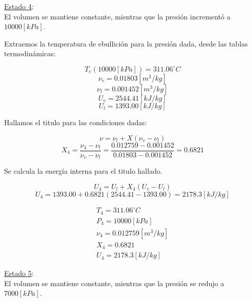 \documentclass[letter,11pt]{article}
\begin{document}
\begin{enumerate}
\underline{Estado 4}:\\
El volumen se mantiene constante, mientras que la presión incrementó a
$10000[kPa]$.

Extraemos la temperatura de ebullición para la presión dada, desde las tablas
termodinámicas:

\begin{equation*}
    T_{e}(10000[kPa])=311.06^\circ C
\end{equation*}
\begin{equation*}
    \nu_v=0.01803[m^3/kg]
\end{equation*}
\begin{equation*}
    \nu_l=0.001452[m^3/kg]
\end{equation*}
\begin{equation*}
    U_v=2544.41[kJ/kg]
\end{equation*}
\begin{equation*}
    U_l=1393.00[kJ/kg]
\end{equation*}

Hallamos el titulo para las condiciones dadas:

\begin{equation*}
    \nu=\nu_l+X(\nu_v-\nu_l)
\end{equation*}
\begin{equation*}
    X_4=\frac{\nu_4-\nu_l}{\nu_v-\nu_l}
    =\frac{0.012759-0.001452}{0.01803-0.001452}
    =0.6821
\end{equation*}

Se calcula la energía interna para el titulo hallado.

\begin{equation*}
    U_4=U_l+X_4(U_v-U_l)
\end{equation*}
\begin{equation*}
    U_4=1393.00+0.6821(2544.41-1393.00)=2178.3[kJ/kg]
\end{equation*}

\begin{equation*}
\boxed{
    \begin{array}{l}
        T_4=311.06^\circ C \\
        P_4=10000[kPa] \\
        \nu_4=0.012759[m^3/kg] \\
        X_4=0.6821 \\
        U_4=2178.3[kJ/kg]
    \end{array}
}
\end{equation*}

\underline{Estado 5}:\\
El volumen se mantiene constante, mientras que la presión se redujo a
$7000[kPa]$.


\end{enumerate}
\end{document}
